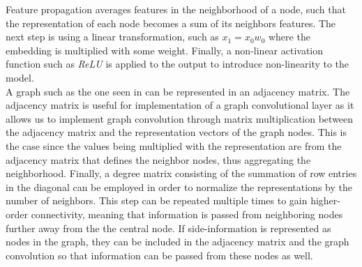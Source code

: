 Feature propagation averages features in the neighborhood of a node, such that the representation of each node becomes a sum of its neighbors features.
The next step is using a linear transformation, such as $x_1 = x_0w_0$ where the embedding is multiplied with some weight.
Finally, a non-linear activation function such as \textit{ReLU} is applied to the output to introduce non-linearity to the model.
\\
A graph such as the one seen in  can be represented in an adjacency matrix. 
The adjacency matrix is useful for implementation of a graph convolutional layer as it allows us to implement graph convolution through matrix multiplication between the adjacency matrix and the representation vectors of the graph nodes.
This is the case since the values being multiplied with the representation are from the adjacency matrix that defines the neighbor nodes, thus aggregating the neighborhood.
Finally, a degree matrix consisting of the summation of row entries in the diagonal can be employed in order to normalize the representations by the number of neighbors.
This step can be repeated multiple times to gain higher-order connectivity, meaning that information is passed from neighboring nodes further away from the the central node\cite{SimplifyingGCN, KOrderConnectivity}.
If side-information is represented as nodes in the graph, they can be included in the adjacency matrix and the graph convolution so that information can be passed from these nodes as well.
